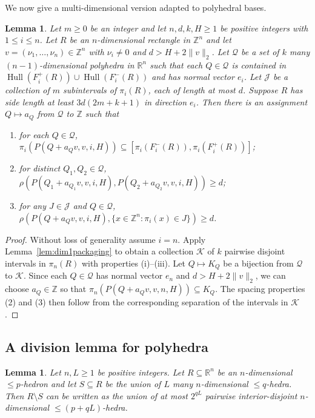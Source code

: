 \documentclass[10pt,a4paper]{amsart}
\newtheorem{lemma}[theorem]{Lemma}
\DeclareMathOperator{\Hull}{Hull}
\begin{document}
We now give a multi-dimensional version adapted to polyhedral bases.

\begin{lemma}\label{lem:1directionmultiple}
Let $m\geq 0$ be an integer and let $n, d, k, H\geq 1$ be positive integers
with $1\leq i\leq n$. Let $R$ be an $n$-dimensional rectangle in
$\mathbb{Z}^n$ and let $v=(\nu_1,\dots,\nu_n)\in\mathbb{Z}^n$ with
$\nu_i\neq 0$ and $d>H+2\|v\|_2$. Let $\mathcal{Q}$ be a set of $k$ many
$(n-1)$-dimensional polyhedra in $\mathbb{R}^n$ such that each
$Q\in\mathcal{Q}$ is contained in
$\Hull(F_i^+(R))\cup\Hull(F_i^-(R))$ and has normal vector $e_i$.
Let $\mathcal{J}$ be a collection of $m$ subintervals of $\pi_i(R)$,
each of length at most $d$. Suppose $R$ has side length at least
$3d(2m+k+1)$ in direction $e_i$. Then there is an assignment
$Q\mapsto a_Q$ from $\mathcal{Q}$ to $\mathbb{Z}$ such that
\begin{enumerate}
\item[(1)] for each $Q\in\mathcal{Q}$,
$\pi_i(P(Q+a_Q v, v, i, H))\subseteq
[\pi_i(F_i^-(R)), \pi_i(F_i^+(R))]$;
\item[(2)] for distinct $Q_1, Q_2\in\mathcal{Q}$,
$\rho(P(Q_1+a_{Q_1} v, v, i, H), P(Q_2+a_{Q_2} v, v, i, H))\geq d$;
\item[(3)] for any $J\in\mathcal{J}$ and $Q\in\mathcal{Q}$,
$\rho(P(Q+a_Q v, v, i, H),
\{x\in\mathbb{Z}^n\colon \pi_i(x)\in J\})\geq d$.
\end{enumerate}
\end{lemma}

\begin{proof}
Without loss of generality assume $i=n$. Apply
Lemma~\ref{lem:dim1packaging} to obtain a collection $\mathcal{K}$ of $k$
pairwise disjoint intervals in $\pi_n(R)$ with properties (i)--(iii).
Let $Q\mapsto K_Q$ be a bijection from $\mathcal{Q}$ to $\mathcal{K}$.
Since each $Q\in\mathcal{Q}$ has normal vector $e_n$ and
$d>H+2\|v\|_2$, we can choose $a_Q\in\mathbb{Z}$ so that
$\pi_n(P(Q+a_Q v, v, n, H))\subseteq K_Q$. The spacing properties (2) and (3) then follow from the corresponding
separation of the intervals in $\mathcal{K}$.
\end{proof}

\subsection{A division lemma for polyhedra}

\begin{lemma}\label{lem:division}
Let $n, L\geq 1$ be positive integers. Let $R\subseteq\mathbb{R}^n$ be an
$n$-dimensional $\leq\!\! p$-hedron and let $S\subseteq R$ be the union of $L$
many $n$-dimensional $\leq\!\! q$-hedra. Then $R\setminus \!S$ can be written as
the union of at most $2^{qL}$ pairwise interior-disjoint $n$-dimensional
$\leq\!\! (p+qL)$-hedra.
\end{lemma}
\end{document}
